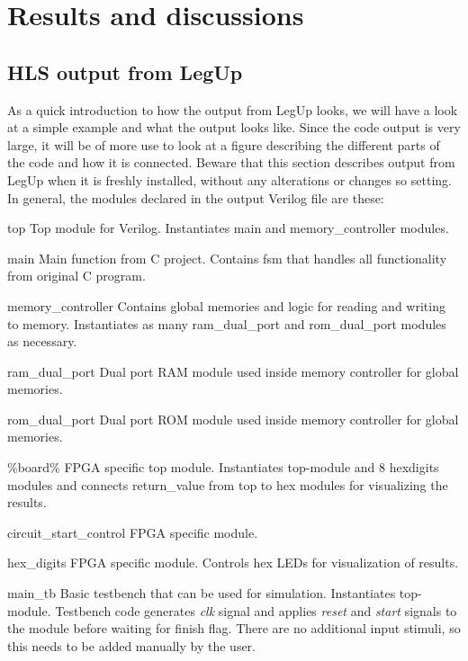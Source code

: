 \chapter{Results and discussions}
\label{chp:resdisc}

\section{HLS output from LegUp}
As a quick introduction to how the output from LegUp looks, we will have a look at a simple example and what the output looks like. Since the code output is very large, it will be of more use to look at a figure describing the different parts of the code and how it is connected. Beware that this section describes output from LegUp when it is freshly installed, without any alterations or changes so setting. In general, the modules declared in the output Verilog file are these:
\begin{compactdesc}
    \item[top]Top module for Verilog. Instantiates main and memory\_controller modules.
    \item[main]Main function from C project. Contains \gls{fsm} that handles all functionality from original C program.
    \item[memory\_controller]Contains global memories and logic for reading and writing to memory. Instantiates as many ram\_dual\_port and rom\_dual\_port modules as necessary.
    \item[ram\_dual\_port] Dual port RAM module used inside memory controller for global memories.
    \item[rom\_dual\_port] Dual port ROM module used inside memory controller for global memories.
    \item[\%board\%]FPGA specific top module. Instantiates top-module and 8 hex{\textunderscore}digits modules and connects return\_value from top to hex modules for visualizing the results.
    \item[circuit\_start\_control]FPGA specific module. 
    \item[hex\_digits]FPGA specific module. Controls hex LEDs for visualization of results.
    \item[main\_tb]Basic testbench that can be used for simulation. Instantiates top-module. Testbench code generates \textit{clk} signal and applies \textit{reset} and \textit{start} signals to the module before waiting for finish flag. There are no additional input stimuli, so this needs to be added manually by the user.
\end{compactdesc}


